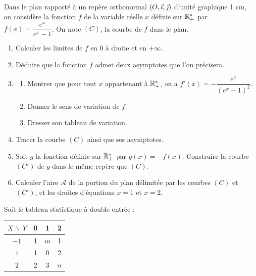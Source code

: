\documentclass[11pt]{article}
\begin{document}

Dans le plan rapporté à un repère orthonormal $(O,\vec{\imath},\vec{\jmath})$ d'unité graphique 1 cm, on considère la fonction $f$ de la variable réelle $x$ définie sur $\mathbb{R}_+^*$ par $f(x) = \dfrac{e^x}{e^x - 1}$. On note $(C)$, la courbe de $f$ dans le plan.

\begin{enumerate}
  \item Calculer les limites de $f$ en 0 à droite et en $+\infty$.
  \item Déduire que la fonction $f$ admet deux asymptotes que l'on précisera.
  \item \begin{enumerate}[label=\alph*.]
    \item Montrer que pour tout $x$ appartenant à $\mathbb{R}_+^*$, on a $f'(x) = -\dfrac{e^x}{(e^x - 1)^2}$.
    \item Donner le sens de variation de $f$.
    \item Dresser son tableau de variation.
  \end{enumerate}
  \item Tracer la courbe $(C)$ ainsi que ses asymptotes.
  \item Soit $g$ la fonction définie sur $\mathbb{R}_+^*$ par $g(x) = -f(x)$. Construire la courbe $(C')$ de $g$ dans le même repère que $(C)$.
  \item Calculer l'aire $\mathcal{A}$ de la portion du plan délimitée par les courbes $(C)$ et $(C')$, et les droites d'équations $x = 1$ et $x = 2$.
\end{enumerate}


Soit le tableau statistique à double entrée :

\begin{center}
\renewcommand{\arraystretch}{1.3}
\begin{tabular}{|c|c|c|c|}
\hline
$X\,\backslash\,Y$ & 0 & 1 & 2 \\
\hline
$-1$ & 1 & $m$ & 1 \\
\hline
$1$ & 1 & 0 & 2 \\
\hline
$2$ & 2 & 3 & $n$ \\
\hline
\end{tabular}
\end{center}
\end{document}
